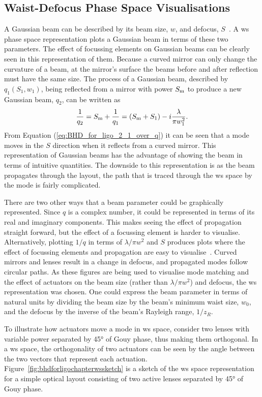 \subsection{Waist-Defocus Phase Space Visualisations}
A Gaussian beam can be described by its beam size, $w$, and defocus, $S$~\cite{Perreca2020}. A \gls{ws} phase space representation plots a Gaussian beam in terms of these two parameters. The effect of focussing elements on Gaussian beams can be clearly seen in this representation of them. Because a curved mirror can only change the curvature of a beam, at the mirror's surface the beams before and after reflection must have the same size. The process of a Gaussian beam, described by $q_1(S_1,w_1)$, being reflected from a mirror with power $S_{\rm{m}}$ to produce a new Gaussian beam, $q_2$, can be written as
\begin{equation}
\frac{1}{q_2} = S_{\rm{m}} + \frac{1}{q_1} = (S_{\rm{m}}+S_1) - i\frac{\lambda}{\pi w_1^2}.
\label{eq:BHD_for_ligo_2_1_over_q}
\end{equation}
From Equation (\ref{eq:BHD_for_ligo_2_1_over_q}) it can be seen that a mode moves in the $S$ direction when it reflects from a curved mirror. This representation of Gaussian beams has the advantage of showing the beam in terms of intuitive quantities. The downside to this representation is as the beam propagates through the layout, the path that is traced through the \gls{ws} space by the mode is fairly complicated. 
\par
There are two other ways that a beam parameter could be graphically represented. Since $q$ is a complex number, it could be represented in terms of its real and imaginary components. This makes seeing the effect of propagation straight forward, but the effect of a focussing element is harder to visualise. Alternatively, plotting $1/q$ in terms of $\lambda/\pi w^2$ and $S$ produces plots where the effect of focussing elements and propagation are easy to visualise~\cite[p.680]{lasers1986}. Curved mirrors and lenses result in a change in defocus, and propagated modes follow circular paths. As these figures are being used to visualise mode matching and the effect of actuators on the beam size (rather than $\lambda/\pi w^2$) and defocus, the \gls{ws} representation was chosen. One could express the beam parameter in terms of natural units by dividing the beam size by the beam's minimum waist size, $w_0$, and the defocus by the inverse of the beam's Rayleigh range, $1/z_R$.
\par
To illustrate how actuators move a mode in \gls{ws} space, consider two lenses with variable power separated by \ang{45} of Gouy phase, thus making them orthogonal. In a \gls{ws} space, the orthogonality of two actuators can be seen by the angle between the two vectors that represent each actuation. Figure~\ref{fig:bhdforligochapterwssketch} is a sketch of the \gls{ws} space representation for a simple optical layout consisting of two active lenses separated by \ang{45} of Gouy phase.
